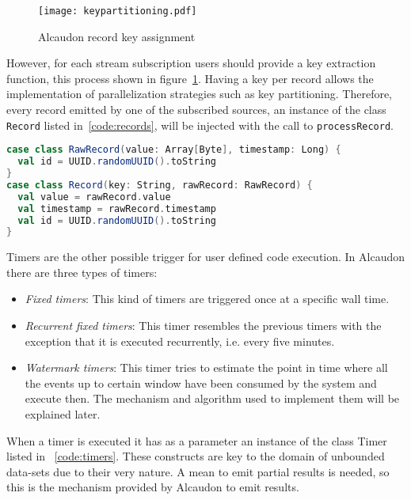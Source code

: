 \begin{figure}
  \begin{center}
    \texttt{[image: keypartitioning.pdf]}
    \caption{Alcaudon record key assignment}
    \label{fig:keypartitioning}
  \end{center}
\end{figure}

However, for each stream subscription users should provide a key extraction
function, this process shown in figure~\ref{fig:keypartitioning}. Having a key
per record allows the implementation of parallelization strategies such as key
partitioning. Therefore, every record emitted by one of the subscribed sources,
an instance of the class \lstinline[columns=fixed]{Record} listed
in~\ref{code:records}, will be injected with the call to
\lstinline[columns=fixed]{processRecord}.

\begin{lstlisting}[language=scala, frame=trBL, label=code:records, float=ht, caption = {Record classes}]
case class RawRecord(value: Array[Byte], timestamp: Long) {
  val id = UUID.randomUUID().toString
}
case class Record(key: String, rawRecord: RawRecord) {
  val value = rawRecord.value
  val timestamp = rawRecord.timestamp
  val id = UUID.randomUUID().toString
}
\end{lstlisting}

Timers are the other possible trigger for user defined code execution. In
Alcaudon there are three types of timers:

\begin{itemize}
\item \textit{Fixed timers}: This kind of timers are triggered once at a
  specific wall time.
\item \textit{Recurrent fixed timers}: This timer resembles the previous timers
  with the exception that it is executed recurrently, i.e. every five minutes.
\item \textit{Watermark timers}: This timer tries to estimate the point in time
  where all the events up to certain window have been consumed by the system and
  execute then. The mechanism and algorithm used to implement them will be
  explained later.
\end{itemize}

When a timer is executed it has as a parameter an instance of the class Timer
listed in ~\ref{code:timers}. These constructs are key to the domain of unbounded
data-sets due to their very nature. A mean to emit partial results is needed, so
this is the mechanism provided by Alcaudon to emit results.

